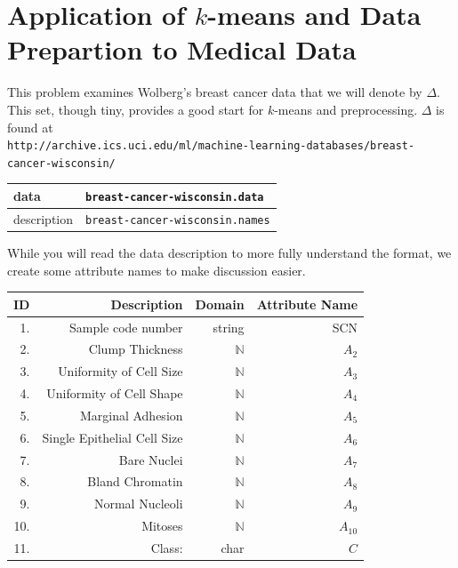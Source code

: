 \documentclass{article}
\begin{document}
\section*{Application of $k$-means and Data Prepartion to Medical Data}

 This problem examines Wolberg's breast cancer data\cite{WMbreast90} that we will denote by $\Delta$. This set, though tiny, provides a good start for $k$-means and preprocessing. $\Delta$ is found at\\
  {\texttt {http://archive.ics.uci.edu/ml/machine-learning-databases/breast-cancer-wisconsin/}}\\
  
  \begin{tabular}[h]{l||l}
data & {\texttt{breast-cancer-wisconsin.data}}\\ \hline 
description &  {\texttt{breast-cancer-wisconsin.names}}  
\end{tabular}

While you will read the data description to more fully understand the format, we create some attribute names to make discussion easier.


\begin{center}
\begin{tabular}[h]{rrrr}
\textsf{ID} & \textsf{Description} & \textsf{Domain} & \textsf{Attribute Name} \\ \hline \hline
 1. & Sample code number        &    string & SCN \\ 
   2.& Clump Thickness             &  $\mathbb{N}$ & $A_2$ \\
   3.& Uniformity of Cell Size     &  $\mathbb{N}$ & $A_3$\\
   4.& Uniformity of Cell Shape  &   $\mathbb{N}$ & $A_4$\\
   5.& Marginal Adhesion           &  $\mathbb{N}$ & $A_5$\\
   6.& Single Epithelial Cell Size  & $\mathbb{N}$ & $A_6$\\
   7.& Bare Nuclei                  & $\mathbb{N}$ & $A_7$\\
   8.& Bland Chromatin          &     $\mathbb{N}$ & $A_8$\\
   9.& Normal Nucleoli           &    $\mathbb{N}$ & $A_9$\\
  10.& Mitoses                       & $\mathbb{N}$ & $A_{10}$\\
  11.& Class:                       & char &  $C$ \\ \hline 
  \end{tabular}
\end{center}
\end{document}

